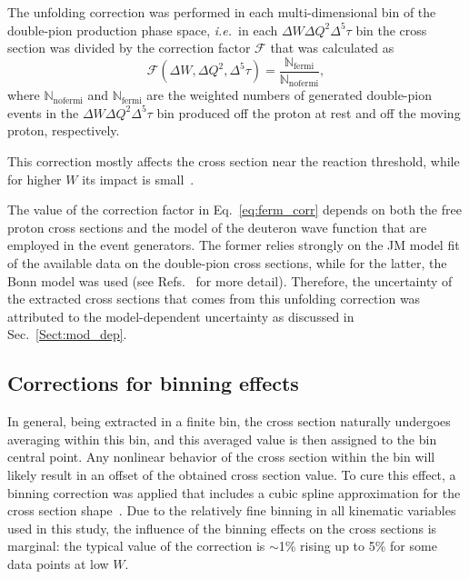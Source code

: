 \documentclass[prc,twocolumn,superscriptaddress,showpacs,amssymb,amsmath,amsfonts,aps,nofootinbib]{revtex4-1}
\begin{document}
The unfolding correction was performed in each multi-dimensional bin of the double-pion production phase space, {\it i.e.}~in each $\Delta W \Delta Q^{2}\Delta^{5}\tau$ bin the cross section was divided by the correction factor $\mathcal{F}$ that was calculated as
\begin{equation}
\mathcal{F}(\Delta W, \Delta Q^{2},\Delta^{5}\tau) = \frac{\mathbb{N}_{\text{fermi}}}{\mathbb{N}_{\text{nofermi}}},
\label{eq:ferm_corr}
\end{equation}
where $\mathbb{N}_{\text{nofermi}}$ and $\mathbb{N}_{\text{fermi}}$ are the weighted numbers of generated double-pion events in the $\Delta W \Delta Q^{2}\Delta^{5}\tau$ bin produced off the proton at rest and off the moving proton, respectively. 

This correction mostly affects the cross section near the reaction threshold, while for higher $W$ its impact is small~\cite{my_an_note:2020, my_thesis:2021}.


The value of the correction factor in Eq.\!~\eqref{eq:ferm_corr} depends on both the free proton cross sections and the model of the deuteron wave function that are employed in the event generators. The former relies strongly on the JM model fit of the available data on the double-pion cross sections, while for the latter, the Bonn model was used (see Refs.\!~\cite{twopeg,twopeg-d} for more detail). Therefore, the uncertainty of the extracted cross sections that comes from this unfolding correction was attributed to the model-dependent uncertainty as discussed in Sec.\!~\ref{Sect:mod_dep}. 


\subsection{Corrections for binning effects}
\label{Sect:bin_cor}

In general, being extracted in a finite bin, the cross section naturally undergoes averaging within this bin, and this averaged value is then assigned to the bin central point. Any nonlinear behavior of the cross section within the bin will likely result in an offset of the obtained cross section value. To cure this effect, a binning correction was applied that includes a cubic spline approximation for the cross section shape~\cite{my_an_note:2020, my_thesis:2021}. Due to the relatively fine binning in all kinematic variables used in this study, the influence of the binning effects on the cross sections is marginal: the typical value of the correction is $\sim$1\% rising up to 5\% for some data points at low $W$.
\end{document}
